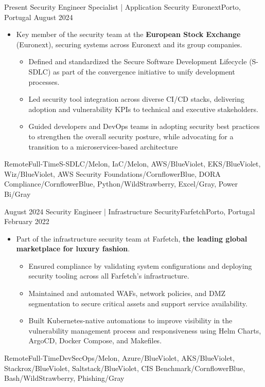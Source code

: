 %
%
%
\begin{experiences}

  \experience
  {Present} {Security Engineer Specialist | Application Security }{Euronext}{Porto, Portugal}
  {August 2024}{
  \begin{itemize}
    \item Key member of the security team at the \textbf{European Stock Exchange} (Euronext), securing systems across Euronext and its group companies.
    \begin{itemize}
        \item Defined and standardized the Secure Software Development Lifecycle (S-SDLC) as part of the convergence initiative to unify development processes.
        \item Led security tool integration across diverse CI/CD stacks, delivering adoption and vulnerability KPIs to technical and executive stakeholders.
        \item Guided developers and DevOps teams in adopting security best practices to strengthen the overall security posture, while advocating for a transition to a microservices-based architecture
    \end{itemize}
  \end{itemize}}
  {Remote}{Full-Time}{S-SDLC/Melon, IaC/Melon, AWS/BlueViolet, EKS/BlueViolet, Wiz/BlueViolet, AWS Security Foundations/CornflowerBlue, DORA Compliance/CornflowerBlue, Python/WildStrawberry, Excel/Gray, Power Bi/Gray}
  
  \emptySeparator

  \experience
  {August 2024} {Security Engineer | Infrastructure Security}{Farfetch}{Porto, Portugal}
  {February 2022}{
  \begin{itemize}
    \item Part of the infrastructure security team at Farfetch, \textbf{the leading global marketplace for luxury fashion}.
       \begin{itemize}
        \item Ensured compliance by validating system configurations and deploying security tooling across all Farfetch’s infrastructure.
        \item Maintained and automated WAFs, network policies, and DMZ segmentation to secure critical assets and support service availability.
        \item  Built Kubernetes-native automations to improve visibility in the vulnerability management process and responsiveness using Helm Charts, ArgoCD, Docker Compose, and Makefiles.
    \end{itemize}
  \end{itemize}}
  {Remote}{Full-Time}{DevSecOps/Melon, Azure/BlueViolet, AKS/BlueViolet, Stackrox/BlueViolet, Saltstack/BlueViolet, CIS Benchmark/CornflowerBlue, Bash/WildStrawberry, Phishing/Gray}


\end{experiences}

